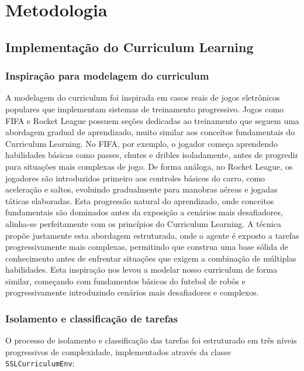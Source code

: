 \chapter{Metodologia}
\label{cap:metodologia}

\section{Implementação do Curriculum Learning}

\subsection{Inspiração para modelagem do curriculum}

A modelagem do curriculum foi inspirada em casos reais de jogos eletrônicos populares que implementam sistemas de treinamento progressivo. Jogos como FIFA e Rocket League possuem seções dedicadas ao treinamento que seguem uma abordagem gradual de aprendizado, muito similar aos conceitos fundamentais do Curriculum Learning. No FIFA, por exemplo, o jogador começa aprendendo habilidades básicas como passes, chutes e dribles isoladamente, antes de progredir para situações mais complexas de jogo. De forma análoga, no Rocket League, os jogadores são introduzidos primeiro aos controles básicos do carro, como aceleração e saltos, evoluindo gradualmente para manobras aéreas e jogadas táticas elaboradas. Esta progressão natural do aprendizado, onde conceitos fundamentais são dominados antes da exposição a cenários mais desafiadores, alinha-se perfeitamente com os princípios do Curriculum Learning. A técnica propõe justamente esta abordagem estruturada, onde o agente é exposto a tarefas progressivamente mais complexas, permitindo que construa uma base sólida de conhecimento antes de enfrentar situações que exigem a combinação de múltiplas habilidades. Esta inspiração nos levou a modelar nosso curriculum de forma similar, começando com fundamentos básicos do futebol de robôs e progressivamente introduzindo cenários mais desafiadores e complexos.

\subsection{Isolamento e classificação de tarefas}

O processo de isolamento e classificação das tarefas foi estruturado em três níveis progressivos de complexidade, implementados através da classe \texttt{SSLCurriculumEnv}:

